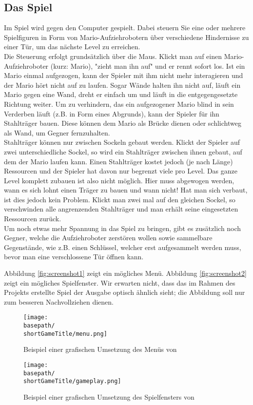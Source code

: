 \subsection{Das Spiel \emph{\gameTitle}}
 
Im Spiel \emph{\gameTitle{}} wird gegen den Computer gespielt. Dabei steuern Sie eine oder mehrere Spielfiguren in Form von Mario-Aufziehrobotern über verschiedene Hindernisse zu einer Tür, um das nächste Level zu erreichen.\\
Die Steuerung erfolgt grundsätzlich über die  Maus. 
Klickt man auf einen Mario-Aufziehroboter (kurz: Mario), "zieht man ihn auf" und er rennt sofort los.
Ist ein Mario einmal aufgezogen, kann der Spieler mit ihm nicht mehr interagieren und der Mario hört nicht auf zu laufen.
Sogar Wände halten ihn nicht auf, läuft ein Mario gegen eine Wand, dreht er einfach um und läuft in die entgegengesetzte Richtung weiter.
Um zu verhindern, das ein aufgezogener Mario blind in sein Verderben läuft (z.B. in Form eines Abgrunds), kann der Spieler für ihn Stahlträger bauen.
Diese können dem Mario als Brücke dienen oder schlichtweg als Wand, um Gegner fernzuhalten.\\
Stahlträger können nur zwischen Sockeln gebaut werden. 
Klickt der Spieler auf zwei unterschiedliche Sockel, so wird ein Stahlträger zwischen ihnen gebaut, auf dem der Mario laufen kann. 
Einen Stahlträger kostet jedoch (je nach Länge) Ressourcen und der Spieler hat davon nur begrenzt viele pro Level. 
Das ganze Level komplett zubauen ist also nicht möglich.
Hier muss abgewogen werden, wann es sich lohnt einen Träger zu bauen und wann nicht!
Hat man sich verbaut, ist dies jedoch kein Problem. 
Klickt man zwei mal auf den gleichen Sockel, so verschwinden alle angrenzenden Stahlträger und man erhält seine eingesetzten Ressourcen zurück. \\
Um noch etwas mehr Spannung in das Spiel zu bringen, gibt es zusätzlich noch Gegner, welche die Aufziehroboter zerstören wollen sowie sammelbare Gegenstände, wie z.B. einen Schlüssel, welcher erst aufgesammelt werden muss, bevor man eine verschlossene Tür öffnen kann.
 
Abbildung \vref{fig:screenshot1} zeigt ein m\"ogliches Menü. Abbildung \vref{fig:screenshot2} zeigt ein mögliches Spielfenster. Wir erwarten nicht, dass das im Rahmen des Projekts erstellte Spiel der Ausgabe optisch \"ahnlich sieht; die Abbildung soll nur zum besseren Nachvollziehen dienen.


\begin{figure}[htb]
\begin{center}
\texttt{[image: \\basepath/\\shortGameTitle/menu.png]}
\caption{Beispiel einer grafischen Umsetzung des Menüs von \gameTitle}
\label{fig:screenshot1}
\end{center}
\end{figure}

\begin{figure}[htb]
\begin{center}
\texttt{[image: \\basepath/\\shortGameTitle/gameplay.png]}
\caption{Beispiel einer grafischen Umsetzung des Spielfensters von \gameTitle}
\label{fig:screenshot2}
\end{center}
\end{figure}
